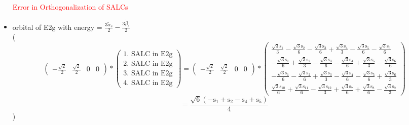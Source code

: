 \documentclass[12pt,a4paper]{article}
\begin{document}
\begin{itemize}
\textcolor{red}{Error in Orthogonalization of SALCs}\item orbital of E2g with energy = 
                                $\frac{3 \tilde{\alpha}_{s}}{2} - \frac{3 \tilde{\beta}_{s}}{2}$ \\
( 
$$
\begin{pmatrix}- \frac{\sqrt{2}}{2} & \frac{\sqrt{2}}{2} & 0 & 0\end{pmatrix} * \left(\begin{array}{c}\text{1. SALC in E2g} \\ \text{2. SALC in E2g} \\ \text{3. SALC in E2g} \\ \text{4. SALC in E2g}\end{array}\right) = \begin{pmatrix}- \frac{\sqrt{2}}{2} & \frac{\sqrt{2}}{2} & 0 & 0\end{pmatrix} * \begin{pmatrix}\frac{\sqrt{3} \text{s}_{1}}{3} - \frac{\sqrt{3} \text{s}_{2}}{6} - \frac{\sqrt{3} \text{s}_{3}}{6} + \frac{\sqrt{3} \text{s}_{4}}{3} - \frac{\sqrt{3} \text{s}_{5}}{6} - \frac{\sqrt{3} \text{s}_{6}}{6}\\- \frac{\sqrt{3} \text{s}_{1}}{6} + \frac{\sqrt{3} \text{s}_{2}}{3} - \frac{\sqrt{3} \text{s}_{3}}{6} - \frac{\sqrt{3} \text{s}_{4}}{6} + \frac{\sqrt{3} \text{s}_{5}}{3} - \frac{\sqrt{3} \text{s}_{6}}{6}\\- \frac{\sqrt{3} \text{s}_{1}}{6} - \frac{\sqrt{3} \text{s}_{2}}{6} + \frac{\sqrt{3} \text{s}_{3}}{3} - \frac{\sqrt{3} \text{s}_{4}}{6} - \frac{\sqrt{3} \text{s}_{5}}{6} + \frac{\sqrt{3} \text{s}_{6}}{3}\\\frac{\sqrt{3} \text{s}_{10}}{6} + \frac{\sqrt{3} \text{s}_{11}}{6} - \frac{\sqrt{3} \text{s}_{12}}{3} + \frac{\sqrt{3} \text{s}_{7}}{6} + \frac{\sqrt{3} \text{s}_{8}}{6} - \frac{\sqrt{3} \text{s}_{9}}{3}\end{pmatrix} 
 $$ $$ = \frac{\sqrt{6} \left(- \text{s}_{1} + \text{s}_{2} - \text{s}_{4} + \text{s}_{5}\right)}{4} 
 $$ 
 )


\end{itemize}
\end{document}

